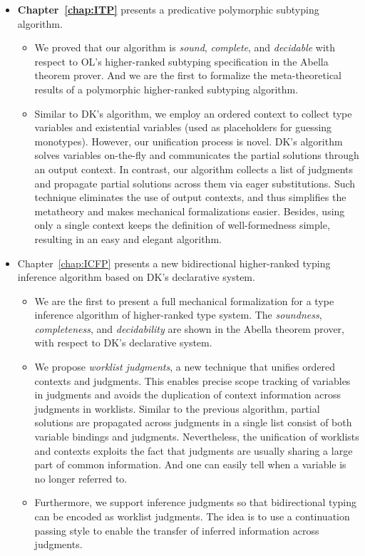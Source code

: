 \begin{itemize}
  \item {\bf Chapter~\ref{chap:ITP}} presents a predicative polymorphic subtyping algorithm.
  \begin{itemize}
    \item We proved that our algorithm is \emph{sound},
      \emph{complete}, and \emph{decidable}
      with respect to OL's higher-ranked subtyping specification
      in the Abella theorem prover.
      And we are the first to formalize the meta-theoretical results of
      a polymorphic higher-ranked subtyping algorithm.
    \item
      Similar to DK's algorithm, we employ an ordered context to collect
      type variables and existential variables (used as placeholders for guessing monotypes).
      However, our unification process is novel.
      DK's algorithm solves variables on-the-fly and communicates
      the partial solutions through an output context.
      In contrast, our algorithm collects a list of judgments and propagate partial solutions
      across them via eager substitutions.
      Such technique eliminates the use of output contexts,
      and thus simplifies the metatheory and makes mechanical formalizations easier.
      Besides, using only a single context keeps the definition of well-formedness simple,
      resulting in an easy and elegant algorithm.
  \end{itemize}

  \item Chapter~\ref{chap:ICFP} presents a new
    bidirectional higher-ranked typing inference algorithm based on DK's declarative system.
    \begin{itemize}
      \item We are the first to present a full mechanical formalization for
        a type inference algorithm of higher-ranked type system.
        The \emph{soundness}, \emph{completeness}, and \emph{decidability} are shown
        in the Abella theorem prover,
        with respect to DK's declarative system.
      \item We propose \emph{worklist judgments},
        a new technique that unifies ordered contexts and judgments.
        This enables precise scope tracking of variables in judgments
        and avoids the duplication of context information across judgments in worklists.
        Similar to the previous algorithm, partial solutions are propagated across
        judgments in a single list consist of both variable bindings and judgments.
        Nevertheless, the unification of worklists and contexts exploits the fact
        that judgments are usually sharing a large part of common information.
        And one can easily tell when a variable is no longer referred to.
      \item Furthermore, we support inference judgments so that bidirectional typing can be
        encoded as worklist judgments.
        The idea is to use a continuation passing style to
        enable the transfer of inferred information across judgments.
    \end{itemize}


\end{itemize}
